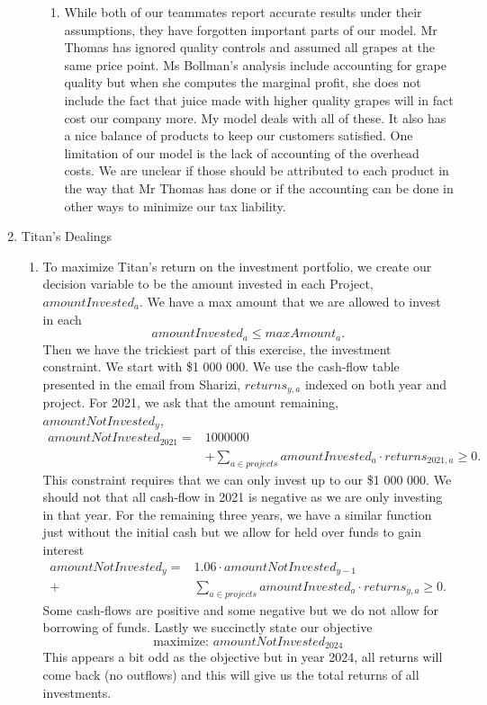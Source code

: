 \documentclass[11pt]{article}
\begin{document}
\begin{enumerate}
\begin{enumerate}
\begin{enumerate}
\item While both of our teammates report accurate results under their assumptions, they have forgotten important parts of our model.  Mr Thomas has ignored quality controls and assumed all grapes at the same price point.  Ms Bollman's analysis include accounting for grape quality but when she computes the marginal profit, she does not include the fact that juice made with higher quality grapes will in fact cost our company more.  My model deals with all of these.  It also has a nice balance of products to keep our customers satisfied.  One limitation of our model is the lack of accounting of the overhead costs.  We are unclear if those should be attributed to each product in the way that Mr Thomas has done or if the accounting can be done in other ways to minimize our tax liability.
\end{enumerate}
\end{enumerate}
\item Titan's Dealings
\begin{enumerate}
\item To maximize Titan's return on the investment portfolio, we create our decision variable to be the amount invested in each Project, $amountInvested_a$.  We have a max amount that we are allowed to invest in each
\[
amountInvested_a \leq maxAmount_a.
\]
Then we have the trickiest part of this exercise, the investment constraint.  We start with \$1 000 000.  We use the cash-flow table presented in the email from Sharizi, $returns_{y,a}$ indexed on both year and project.  For 2021, we ask that the amount remaining, $amountNotInvested_y$,
\begin{align*}
amountNotInvested_{2021} =& 1 000 000\\
& + \displaystyle\sum_{a \in projects} amountInvested_a\cdot returns_{2021,a}\geq 0.
\end{align*}
This constraint requires that we can only invest up to our \$1 000 000.  We should not that all cash-flow in 2021 is negative as we are only investing in that year.  For the remaining three years, we have a similar function just without the initial cash but we allow for held over funds to gain interest
\begin{align*}
amountNotInvested_y =& 1.06 \cdot amountNotInvested_{y-1}\\
+&\displaystyle\sum_{a \in projects} amountInvested_a\cdot returns_{y,a}\geq 0.
\end{align*}
Some cash-flows are positive and some negative but we do not allow for borrowing of funds.  Lastly we succinctly state our objective
\[
\text{maximize: }amountNotInvested_{2024}
\]
This appears a bit odd as the objective but in year 2024, all returns will come back (no outflows) and this will give us the total returns of all investments.


\end{enumerate}
\end{enumerate}
\end{document}
